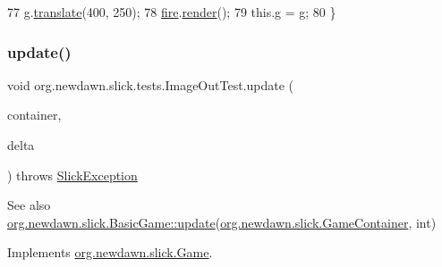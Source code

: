 \begin{DoxyCode}
77         \mbox{\hyperlink{classorg_1_1newdawn_1_1slick_1_1tests_1_1_image_out_test_a0007b2187e2d4d26bdb2d90b39c62479}{g}}.\mbox{\hyperlink{classorg_1_1newdawn_1_1slick_1_1_graphics_ad75589e65f1d524870c0b719172ba065}{translate}}(400, 250);
78         \mbox{\hyperlink{classorg_1_1newdawn_1_1slick_1_1tests_1_1_image_out_test_a2e0a07e6c79bc05ee2dea61df862bee1}{fire}}.\mbox{\hyperlink{classorg_1_1newdawn_1_1slick_1_1particles_1_1_particle_system_a81fd0123e1b180410a33e80a052cbfac}{render}}();
79         this.\mbox{\hyperlink{classorg_1_1newdawn_1_1slick_1_1tests_1_1_image_out_test_a0007b2187e2d4d26bdb2d90b39c62479}{g}} = \mbox{\hyperlink{classorg_1_1newdawn_1_1slick_1_1tests_1_1_image_out_test_a0007b2187e2d4d26bdb2d90b39c62479}{g}};
80     \}
\end{DoxyCode}
\mbox{\label{classorg_1_1newdawn_1_1slick_1_1tests_1_1_image_out_test_a2ad0819a415d35df9176c54e4fd54d78}} 
\subsubsection{\texorpdfstring{update()}{update()}}
{\footnotesize\ttfamily void org.\+newdawn.\+slick.\+tests.\+Image\+Out\+Test.\+update (\begin{DoxyParamCaption}\item[{\mbox{\hyperlink{classorg_1_1newdawn_1_1slick_1_1_game_container}{Game\+Container}}}]{container,  }\item[{int}]{delta }\end{DoxyParamCaption}) throws \mbox{\hyperlink{classorg_1_1newdawn_1_1slick_1_1_slick_exception}{Slick\+Exception}}\hspace{0.3cm}{\ttfamily [inline]}}

\begin{DoxySeeAlso}{See also}
\mbox{\hyperlink{classorg_1_1newdawn_1_1slick_1_1_basic_game_acfe6fa05aef83bff1631af91a3e4bd20}{org.\+newdawn.\+slick.\+Basic\+Game\+::update}}(\mbox{\hyperlink{classorg_1_1newdawn_1_1slick_1_1_game_container}{org.\+newdawn.\+slick.\+Game\+Container}}, int) 
\end{DoxySeeAlso}


Implements \mbox{\hyperlink{interfaceorg_1_1newdawn_1_1slick_1_1_game_ab07b2e9463ee4631620dde0de25bdee8}{org.\+newdawn.\+slick.\+Game}}.


